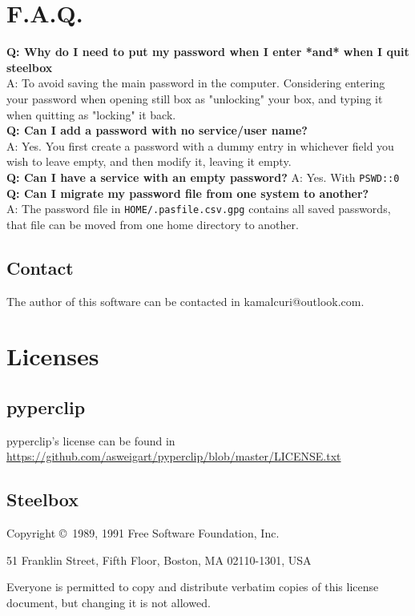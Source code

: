 \documentclass{article}
\begin{document}
  \section{F.A.Q.}
  \textbf{Q: Why do I need to put my password when I enter *and* when I quit steelbox}\\
  A: To avoid saving the main password in the computer. Considering entering your password when opening still box as "unlocking" your box, and typing
  it when quitting as "locking" it back.\\
  \textbf{Q: Can I add a password with no service/user name?}\\
  A: Yes. You first create a password with a dummy entry in whichever field you wish to leave empty, and then modify it, leaving it empty.\\
  \textbf{Q: Can I have a service with an empty password?}
  A: Yes. With \texttt{PSWD::0}
  \textbf{Q: Can I migrate my password file from one system to another?}\\
  A: The password file in \texttt{\textdollar HOME/.pasfile.csv.gpg} contains all saved passwords, that file can be moved from one home directory to another.
  \subsection{Contact}
  The author of this software can be contacted in kamalcuri@outlook.com.

  \section{Licenses}
    \subsection{pyperclip}
    pyperclip's license can be found in \url{https://github.com/asweigart/pyperclip/blob/master/LICENSE.txt}
    \subsection{Steelbox}
    \begin{center}
      {\parindent 0in
      
      Copyright \copyright\ 1989, 1991 Free Software Foundation, Inc.
      
      \bigskip
      
      51 Franklin Street, Fifth Floor, Boston, MA  02110-1301, USA
      
      \bigskip
      
      Everyone is permitted to copy and distribute verbatim copies
      of this license document, but changing it is not allowed.
      }
      \end{center}
      
\end{document}
